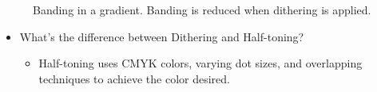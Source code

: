 \documentclass{beamer}
\begin{document}
\begin{frame}
   \begin{figure}[!htbp]
   \begin{center}
   \caption{Banding in a gradient. Banding is reduced when dithering is applied.}
   \end{center}
   \end{figure}   
\end{frame}

\begin{frame}
   \begin{itemize}
   \item{What's the difference between Dithering and Half-toning?}
   \pause
      \begin{itemize}
      \item{Half-toning uses CMYK colors, varying dot sizes, and overlapping techniques to achieve the color desired.}
      \end{itemize}
   \end{itemize}
   
   \pause
   \begin{figure}[!htbp]
   \begin{center}
   \end{center}
   \end{figure}
   
\end{frame}
\end{document}
